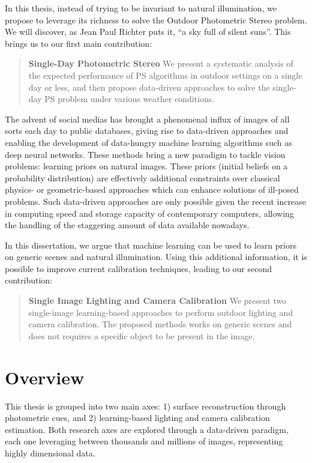 In this thesis, instead of trying to be invariant to natural illumination, we propose to leverage its richness to solve the Outdoor Photometric Stereo problem. We will discover, as Jean Paul Richter puts it, ``a sky full of silent suns''. This brings us to our first main contribution:
\begin{quotation}
\textbf{Single-Day Photometric Stereo} We present a systematic analysis of the expected performance of PS algorithms in outdoor settings on a single day or less, and then propose data-driven approaches to solve the single-day PS problem under various weather conditions.
\end{quotation}


The advent of social medias has brought a phenomenal influx of images of all sorts each day to public databases, giving rise to data-driven approaches and enabling the development of data-hungry machine learning algorithms such as deep neural networks. These methods bring a new paradigm to tackle vision problems: learning priors on natural images. These priors (initial beliefs on a probability distribution) are effectively additional constraints over classical physics- or geometric-based approaches which can enhance solutions of ill-posed problems. Such data-driven approaches are only possible given the recent increase in computing speed and storage capacity of contemporary computers, allowing the handling of the staggering amount of data available nowadays.

In this dissertation, we argue that machine learning can be used to learn priors on generic scenes and natural illumination. Using this additional information, it is possible to improve current calibration techniques, leading to our second contribution:
\begin{quotation}
\textbf{Single Image Lighting and Camera Calibration} We present two single-image learning-based approaches to perform outdoor lighting and camera calibration. The proposed methods works on generic scenes and does not requires a specific object to be present in the image.
\end{quotation}


\section*{Overview}

This thesis is grouped into two main axes: 1) surface reconstruction through photometric cues, and 2) learning-based lighting and camera calibration estimation. Both research axes are explored through a data-driven paradigm, each one leveraging between thousands and millions of images, representing highly dimensional data.

